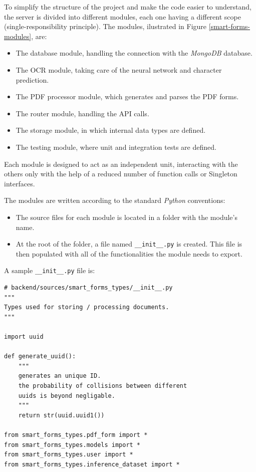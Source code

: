 \documentclass[11pt, a4paper]{report}
\def\code#1{\texttt{#1}}
\begin{document}
To simplify the structure of the project and make the code easier to understand, the server is divided into different modules, each one having a different scope (single-responsibility principle). The modules, ilustrated in Figure \ref{smart-forms-modules}, are:
\begin{itemize}
    \item The database module, handling the connection with the \textit{MongoDB} database.
    \item The OCR module, taking care of the neural network and character prediction.
    \item The PDF processor module, which generates and parses the PDF forms.
    \item The router module, handling the API calls.
    \item The storage module, in which internal data types are defined.
    \item The testing module, where unit and integration tests are defined.
\end{itemize}


Each module is designed to act as an independent unit, interacting with the others only with the help of a reduced number of function calls or Singleton interfaces.

The modules are written according to the standard \textit{Python} conventions:
\begin{itemize}
    \item The source files for each module is located in a folder with the module's name.
    \item At the root of the folder, a file named \code{\_\_init\_\_.py} is created. This file is then populated with all of the functionalities the module needs to export.
\end{itemize}

A sample \code{\_\_init\_\_.py} file is:

\begin{verbatim}
# backend/sources/smart_forms_types/__init__.py
"""
Types used for storing / processing documents.
"""

import uuid

def generate_uuid():
    """
    generates an unique ID.
    the probability of collisions between different
    uuids is beyond negligable.
    """
    return str(uuid.uuid1())

from smart_forms_types.pdf_form import *
from smart_forms_types.models import *
from smart_forms_types.user import *
from smart_forms_types.inference_dataset import *
\end{verbatim}
\end{document}
